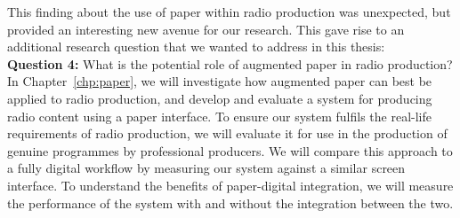 This finding about the use of paper within radio production was unexpected, but provided an interesting new avenue for
our research. This gave rise to an additional research question that we wanted to address in this thesis:
\\

\noindent
\textbf{Question 4:} What is the potential role of augmented paper in radio production?
\\

In Chapter~\ref{chp:paper}, we will investigate how augmented paper can best be applied to radio production, and
develop and evaluate a system for producing radio content using a paper interface.  To ensure our system fulfils the
real-life requirements of radio production, we will evaluate it for use in the production of genuine programmes by
professional producers.  We will compare this approach to a fully digital workflow by measuring our system against a
similar screen interface. To understand the benefits of paper-digital integration, we will measure the performance of
the system with and without the integration between the two.

